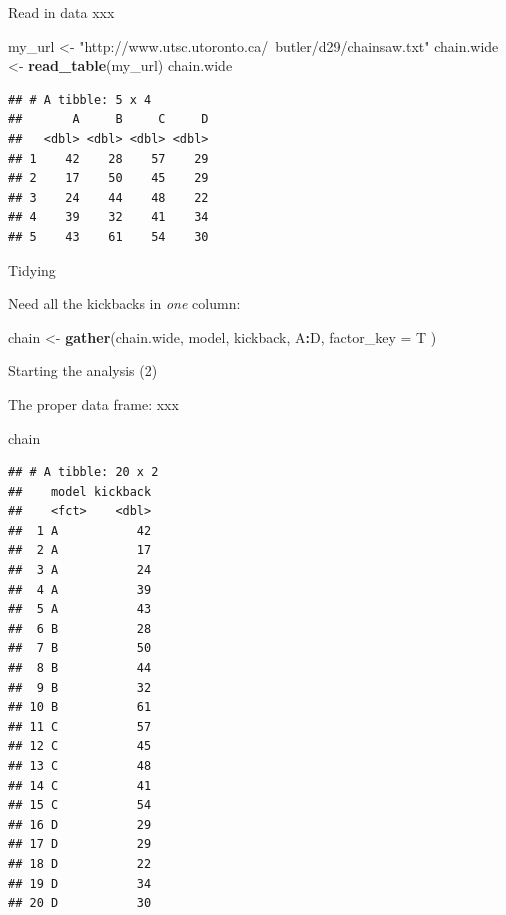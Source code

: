 \documentclass[ignorenonframetext,]{beamer}
\newenvironment{Shaded}{\begin{snugshade}}{\end{snugshade}}
\newcommand{\DataTypeTok}[1]{\textcolor[rgb]{0.13,0.29,0.53}{#1}}
\newcommand{\KeywordTok}[1]{\textcolor[rgb]{0.13,0.29,0.53}{\textbf{#1}}}
\newcommand{\NormalTok}[1]{#1}
\newcommand{\OperatorTok}[1]{\textcolor[rgb]{0.81,0.36,0.00}{\textbf{#1}}}
\newcommand{\StringTok}[1]{\textcolor[rgb]{0.31,0.60,0.02}{#1}}
\begin{document}
\begin{frame}[fragile]{Read in data xxx}
\protect\hypertarget{read-in-data-xxx}{}

\footnotesize

\begin{Shaded}
\begin{Highlighting}[]
\NormalTok{my_url <-}\StringTok{ "http://www.utsc.utoronto.ca/~butler/d29/chainsaw.txt"}
\NormalTok{chain.wide <-}\StringTok{ }\KeywordTok{read_table}\NormalTok{(my_url)}
\NormalTok{chain.wide}
\end{Highlighting}
\end{Shaded}

\begin{verbatim}
## # A tibble: 5 x 4
##       A     B     C     D
##   <dbl> <dbl> <dbl> <dbl>
## 1    42    28    57    29
## 2    17    50    45    29
## 3    24    44    48    22
## 4    39    32    41    34
## 5    43    61    54    30
\end{verbatim}

\normalsize

\end{frame}

\begin{frame}[fragile]{Tidying}
\protect\hypertarget{tidying}{}

Need all the kickbacks in \emph{one} column:

\begin{Shaded}
\begin{Highlighting}[]
\NormalTok{chain <-}\StringTok{ }\KeywordTok{gather}\NormalTok{(chain.wide, model, kickback, A}\OperatorTok{:}\NormalTok{D,}
  \DataTypeTok{factor_key =}\NormalTok{ T}
\NormalTok{)}
\end{Highlighting}
\end{Shaded}

\end{frame}

\begin{frame}[fragile]{Starting the analysis (2)}
\protect\hypertarget{starting-the-analysis-2}{}

The proper data frame: xxx

\tiny

\begin{Shaded}
\begin{Highlighting}[]
\NormalTok{chain }
\end{Highlighting}
\end{Shaded}

\begin{verbatim}
## # A tibble: 20 x 2
##    model kickback
##    <fct>    <dbl>
##  1 A           42
##  2 A           17
##  3 A           24
##  4 A           39
##  5 A           43
##  6 B           28
##  7 B           50
##  8 B           44
##  9 B           32
## 10 B           61
## 11 C           57
## 12 C           45
## 13 C           48
## 14 C           41
## 15 C           54
## 16 D           29
## 17 D           29
## 18 D           22
## 19 D           34
## 20 D           30
\end{verbatim}

\normalsize

\end{frame}
\end{document}
